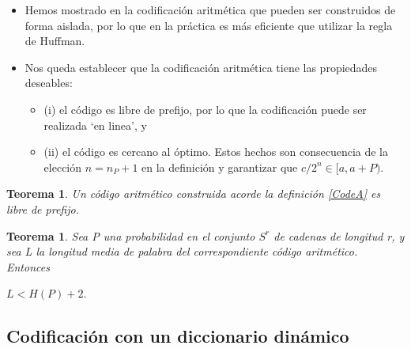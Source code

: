 \documentclass{beamer}
\theoremstyle{plain}
\newtheorem{teorema} [Teorema] {Teorema}
\theoremstyle{example}
\theoremstyle{example}
\begin{document}
\begin{frame}  \footnotesize

\begin{itemize}
\item Hemos mostrado en la codificación aritmética que pueden ser construidos de forma aislada, por lo que en la práctica es más eficiente que utilizar la regla de Huffman. 

\item Nos queda establecer que la codificación aritmética tiene las propiedades deseables: 

\begin{itemize}
\item  (i) el código es libre de prefijo, por lo que la codificación puede ser realizada `en linea', y 
\item (ii) el código es cercano al óptimo. Estos hechos son consecuencia de la elección $n = n_P  +1 $ en la definición y  garantizar que \(c/2^n \in [a,a+P)\).
\end{itemize}
\end{itemize}



\begin{teorema}
Un código aritmético construida acorde la definición \ref{CodeA} es libre de prefijo.
\end{teorema}


\begin{teorema}
Sea P una probabilidad en el conjunto $S^r$ de cadenas de longitud r, y sea L la longitud media de palabra del correspondiente código aritmético. Entonces

\begin{center}
$L < H(P) + 2.$
\end{center}
\end{teorema}


\end{frame} 
\subsection{Codificación con un diccionario dinámico}
\end{document}
